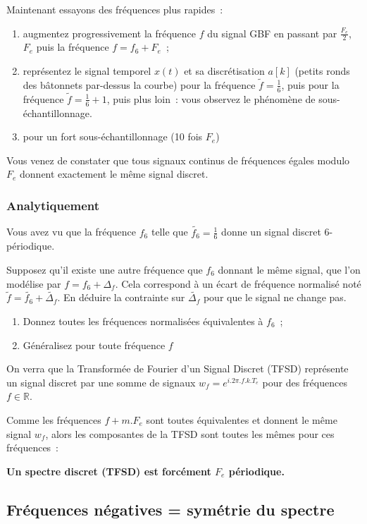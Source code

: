 \documentclass[a4paper,twoside,12pt]{report}           %
\begin{document}
Maintenant essayons des fréquences plus rapides~:
\begin{enumerate}
\item augmentez progressivement la fréquence $f$ du signal GBF en
  passant par $\frac{F_e}{2}$, $F_e$ puis la fréquence $f=f_6 + F_e$~;
\item représentez le signal temporel $x(t)$ et sa discrétisation
  $a[k]$ (petits ronds des bâtonnets par-dessus la courbe) pour la
  fréquence $\widetilde{f}=\frac{1}{6}$, puis pour la fréquence
  $\widetilde{f}=\frac{1}{6} + 1$, puis plus loin~: vous observez le
  phénomène de sous-échantillonnage.
\item pour un fort sous-échantillonnage (10 fois $F_e$)
\end{enumerate}

Vous venez de constater que tous signaux continus de fréquences égales
modulo $F_e$ donnent exactement le même signal discret.

\subsubsection{Analytiquement}
Vous avez vu que la fréquence $f_6$ telle que
$\widetilde{f_6}=\frac{1}{6}$ donne un signal discret 6-périodique.

Supposez qu'il existe une autre fréquence que $f_6$ donnant le même
signal, que l'on modélise par $f = f_6 + \Delta_f$. Cela correspond à
un écart de fréquence normalisé noté
$\widetilde{f} = \widetilde{f_6} + \widetilde{\Delta_f}$. En déduire
la contrainte sur $\widetilde{\Delta_f}$ pour que le signal ne change
pas.
\begin{enumerate}
\item Donnez toutes les fréquences normalisées équivalentes à $f_6$~;
\item Généralisez pour toute fréquence $f$
\end{enumerate}

On verra que la Transformée de Fourier d'un Signal Discret (TFSD)
représente un signal discret par une somme de signaux
$w_f=e^{i.2\pi.f.k.T_e}$ pour des fréquences $f\in\mathbb{R}$.

Comme les fréquences $f+m.F_e$ sont toutes équivalentes et donnent le
même signal $w_f$, alors les composantes de la TFSD sont toutes les
mêmes pour ces fréquences~:

\textbf{Un spectre discret (TFSD) est forcément $F_e$ périodique.}

\subsection{Fréquences négatives = symétrie du spectre}
\end{document}

